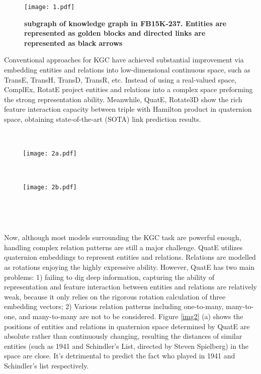\documentclass[letterpaper]{article} \usepackage{aaai20}  \usepackage{times}  \usepackage{helvet} \usepackage{courier}  \usepackage[hyphens]{url}  \usepackage{graphicx} \usepackage{lineno,hyperref,amsmath,amssymb}
\begin{document}
\begin{figure}[h]
    \centering
    \texttt{[image: 1.pdf]}
    \caption{\textbf{subgraph of knowledge graph in FB15K-237. Entities are represented as golden blocks and directed links are represented as black arrows}}
    \label{img1}
\end{figure}

Conventional approaches for KGC have achieved substantial improvement via embedding entities and relations into low-dimensional continuous space, such as TransE\cite{bordes2013translating}, TransH\cite{wang2014knowledge}, TransD\cite{ji2015knowledge}, TransR\cite{lin2015learning}, etc. Instead of using a real-valued space, ComplEx\cite{trouillon2016complex}, RotatE\cite{sun2019rotate} project entities and relations into a complex space preforming the strong representation ability. Meanwhile, QuatE\cite{zhang2019quaternion}, Rotate3D\cite{gao2020rotate3d} show the rich feature interaction capacity between triple with Hamilton product in quaternion space, obtaining state-of-the-art (SOTA) link prediction results.

\begin{figure*}[htbp]  
    \begin{minipage}[t]{0.5\linewidth}  
        \centering  
\texttt{[image: 2a.pdf]}  
        \caption*{(a) QuatE}  
    \end{minipage}\begin{minipage}[t]{0.5\linewidth}  
        \centering  
        \texttt{[image: 2b.pdf]}  
        \caption*{(b) QuatDE}  
    \end{minipage}
    \caption{\textbf{Simple illustration of QuatDE, Entities () and directed links () are represented as colored circles and black arrows, respectively. The red curves () symbolize the dynamic mapping strategy which are determined by the elements in different triples. We draw similar entities into one dotted circle.}}  
    \label{img2}
\end{figure*}


Now, although most models surrounding the KGC task are powerful enough, handling complex relation patterns are still a major challenge. QuatE utilizes quaternion embeddings to represent entities and relations. Relations are modelled as rotations enjoying the highly expressive ability. However, QuatE has two main problems: 1) failing to dig deep information, capturing the ability of representation and feature interaction between entities and relations are relatively weak, because it only relies on the rigorous rotation calculation of three embedding vectors; 2) Various relation patterns including one-to-many, many-to-one, and many-to-many are not to be considered. Figure \ref{img2} (a) shows the positions of entities and relations in quaternion space determined by QuatE are absolute rather than continuously changing, resulting the distances of similar entities (such as 1941 and Schindler’s List, directed by Steven Spielberg) in the space are close. It’s detrimental to predict the fact who played in 1941 and Schindler’s list respectively.
\end{document}
